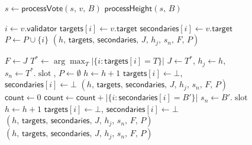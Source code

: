 \ifx\litemode\undefined\documentclass{article}\fi
\newcommand{\slot}[0]{\ensuremath{\operatorname{\mathrm{slot}}}}
\theoremstyle{plain}
\theoremstyle{definition}
\theoremstyle{remark}
\begin{document}
\begin{figure}[h!]
\centering
\begin{boxedminipage}{\textwidth}
\begin{algorithmic}[1]

   $s \gets \textsf{processVote}(s,\, v,\, B)$ \EndFor
  \State \Return $\textsf{processHeight}(s,\, B)$
\EndFunction
\vspace{3pt}

  \State $i \gets v.\mathsf{validator}$
    \State $\mathsf{targets}[i] \gets v.\mathsf{target}$
  \EndIf
    \State $\mathsf{secondaries}[i] \gets v.\mathsf{target}$
  \EndIf
    \State $P \gets P \cup \{i\}$
  \EndIf
  \State \Return $(h,\, \mathsf{targets},\, \mathsf{secondaries},\, J,\, h_j,\, s_n,\, F,\, P)$
\EndFunction
\vspace{3pt}

   
    \State $F \gets J$
  \EndIf
  \State $T^* \gets \arg\max_T |\{i : \mathsf{targets}[i] = T\}|$ 
   
    \If{$T^*.\slot > s_n$} 
      \State $J \gets T^*$, \; $h_j \gets h$, \; $s_n \gets T^*.\slot$, \; $P \gets \emptyset$
    \EndIf
    \State $h \gets h + 1$
     $\mathsf{targets}[i] \gets \bot$, \; $\mathsf{secondaries}[i] \gets \bot$ \EndFor
    \State \Return $(h,\, \mathsf{targets},\, \mathsf{secondaries},\, J,\, h_j,\, s_n,\, F,\, P)$
  \EndIf
  \State $\mathsf{count} \gets 0$ 
    \State $\mathsf{count} \gets \mathsf{count} + |\{i : \mathsf{secondaries}[i] = B'\}|$
     
      \If{$B'.\slot > s_n$} 
        \State $s_n \gets B'.\slot$
      \EndIf
      \State $h \gets h + 1$
       $\mathsf{targets}[i] \gets \bot$, \; $\mathsf{secondaries}[i] \gets \bot$ \EndFor
      \State \Return $(h,\, \mathsf{targets},\, \mathsf{secondaries},\, J,\, h_j,\, s_n,\, F,\, P)$
    \EndIf
  \EndFor
  \State \Return $(h,\, \mathsf{targets},\, \mathsf{secondaries},\, J,\, h_j,\, s_n,\, F,\, P)$
\EndFunction
\vspace{3pt}


\end{algorithmic}
\end{boxedminipage}
\end{figure}
\end{document}
